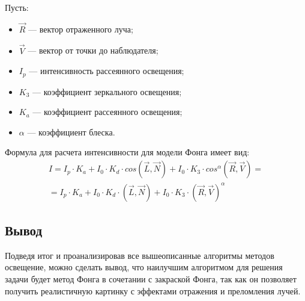 Пусть:
\begin{itemize}
	\item $\overrightarrow R$ --- вектор отраженного луча;
	\item $\overrightarrow V$ --- вектор от точки до наблюдателя;
	\item $I_p$ --- интенсивность рассеянного освещения;
	\item $K_3$ --- коэффициент зеркального освещения;
	\item $K_a$ --- коэффициент рассеянного освещения;
	\item $\alpha$ --- коэффициент блеска.
\end{itemize}
 
Формула для расчета интенсивности для модели Фонга имеет вид:
\begin{equation}
	\label{eq:lambert}
	\begin{aligned}
		I = I_p \cdot K_a  + I_0 \cdot K_d \cdot cos(\overrightarrow L, \overrightarrow N) + I_0 \cdot K_3 \cdot cos^{\alpha}(\overrightarrow R, \overrightarrow V) = \\ = I_p \cdot K_a  + I_0 \cdot K_d \cdot (\overrightarrow L, \overrightarrow N) + I_0 \cdot K_3 \cdot (\overrightarrow R, \overrightarrow V)^{\alpha} 
	\end{aligned}
\end{equation}
 
\subsection*{Вывод}
Подведя итог и проанализировав все вышеописанные алгоритмы методов освещение, можно сделать вывод, что наилучшим алгоритмом для решения задачи будет метод Фонга в сочетании с закраской Фонга, так как он позволяет получить реалистичную картинку с эффектами отражения и преломления лучей. 